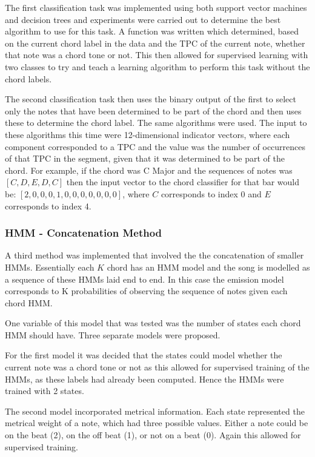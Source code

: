\documentclass[bsc,singlespacing,parskip,deptreport,twoside,frontabs]{infthesis}
\begin{document}
The first classification task was implemented using both support vector machines and decision trees and experiments were carried out to determine the best algorithm to use for this task. A function was written which determined, based on the current chord label in the data and the TPC of the current note, whether that note was a chord tone or not. This then allowed for supervised learning with two classes to try and teach a learning algorithm to perform this task without the chord labels.

The second classification task then uses the binary output of the first to select only the notes that have been determined to be part of the chord and then uses these to determine the chord label. The same algorithms were used. The input to these algorithms this time were 12-dimensional indicator vectors, where each component corresponded to a TPC and the value was the number of occurrences of that TPC in the segment, given that it was determined to be part of the chord. For example, if the chord was C Major and the sequences of notes was $[C,D,E,D,C]$ then the input vector to the chord classifier for that bar would be: $[2,0,0,0,1,0,0,0,0,0,0,0]$, where $C$ corresponds to index 0 and $E$ corresponds to index 4.

\subsubsection{HMM - Concatenation Method}

A third method was implemented that involved the the concatenation of smaller HMMs. Essentially each $K$ chord has an HMM model and the song is modelled as a sequence of these HMMs laid end to end. In this case the emission model corresponds to K probabilities of observing the sequence of notes given each chord HMM.

One variable of this model that was tested was the number of states each chord HMM should have. Three separate models were proposed.

For the first model it was decided that the states could model whether the current note was a chord tone or not as this allowed for supervised training of the HMMs, as these labels had already been computed. Hence the HMMs were trained with 2 states.

The second model incorporated metrical information. Each state represented the metrical weight of a note, which had three possible values. Either a note could be on the beat (2), on the off beat (1), or not on a beat (0). Again this allowed for supervised training.
\end{document}
